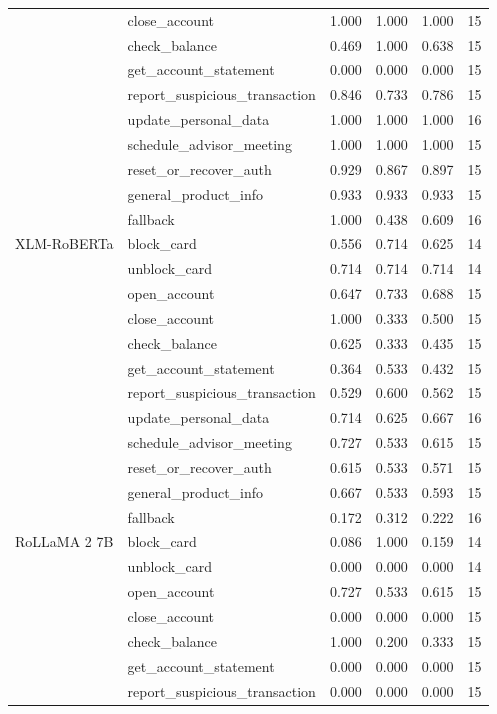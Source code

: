 \begin{table}[H]
\begin{tabular}{llcccc}
 & close\_account & 1.000 & 1.000 & 1.000 & 15 \\
 & check\_balance & 0.469 & 1.000 & 0.638 & 15 \\
 & get\_account\_statement & 0.000 & 0.000 & 0.000 & 15 \\
 & report\_suspicious\_transaction & 0.846 & 0.733 & 0.786 & 15 \\
 & update\_personal\_data & 1.000 & 1.000 & 1.000 & 16 \\
 & schedule\_advisor\_meeting & 1.000 & 1.000 & 1.000 & 15 \\
 & reset\_or\_recover\_auth & 0.929 & 0.867 & 0.897 & 15 \\
 & general\_product\_info & 0.933 & 0.933 & 0.933 & 15 \\
 & fallback & 1.000 & 0.438 & 0.609 & 16 \\
\midrule
XLM-RoBERTa & block\_card & 0.556 & 0.714 & 0.625 & 14 \\
 & unblock\_card & 0.714 & 0.714 & 0.714 & 14 \\
 & open\_account & 0.647 & 0.733 & 0.688 & 15 \\
 & close\_account & 1.000 & 0.333 & 0.500 & 15 \\
 & check\_balance & 0.625 & 0.333 & 0.435 & 15 \\
 & get\_account\_statement & 0.364 & 0.533 & 0.432 & 15 \\
 & report\_suspicious\_transaction & 0.529 & 0.600 & 0.562 & 15 \\
 & update\_personal\_data & 0.714 & 0.625 & 0.667 & 16 \\
 & schedule\_advisor\_meeting & 0.727 & 0.533 & 0.615 & 15 \\
 & reset\_or\_recover\_auth & 0.615 & 0.533 & 0.571 & 15 \\
 & general\_product\_info & 0.667 & 0.533 & 0.593 & 15 \\
 & fallback & 0.172 & 0.312 & 0.222 & 16 \\
\midrule
RoLLaMA 2 7B & block\_card & 0.086 & 1.000 & 0.159 & 14 \\
 & unblock\_card & 0.000 & 0.000 & 0.000 & 14 \\
 & open\_account & 0.727 & 0.533 & 0.615 & 15 \\
 & close\_account & 0.000 & 0.000 & 0.000 & 15 \\
 & check\_balance & 1.000 & 0.200 & 0.333 & 15 \\
 & get\_account\_statement & 0.000 & 0.000 & 0.000 & 15 \\
 & report\_suspicious\_transaction & 0.000 & 0.000 & 0.000 & 15 \\

\end{tabular}
\end{table}
